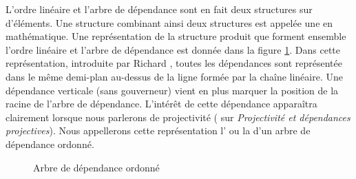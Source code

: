 L’ordre linéaire et l’arbre de dépendance sont en fait deux structures sur  d’éléments.  Une structure combinant ainsi deux structures est appelée une  en mathématique.
Une représentation de la structure produit que forment ensemble l’ordre linéaire et l’arbre de dépendance est donnée dans la figure \ref{fig:noel-Hudson}. Dans cette représentation, introduite par Richard \citet{hudson1984word}, toutes les dépendances sont représentée dans le même demi-plan au-dessus de la ligne formée par la chaîne linéaire. Une dépendance verticale (sans gouverneur) vient en plus marquer la position de la racine de l'arbre de dépendance. L’intérêt de cette dépendance apparaîtra clairement lorsque nous parlerons de projectivité ( sur \textit{Projectivité et dépendances projectives}). Nous appellerons cette représentation l' ou la   d'un arbre de dépendance ordonné.

\begin{figure}
\caption{Arbre de dépendance ordonné\label{fig:noel-Hudson}}
\end{figure}




